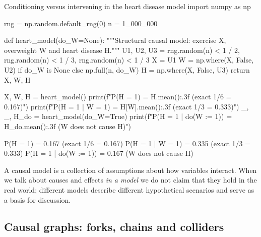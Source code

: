 \begin{pylisting}[label={lst:heart}]{Conditioning versus intervening in the heart disease model}
import numpy as np

rng = np.random.default_rng(0)
n = 1_000_000

def heart_model(do_W=None):
    """Structural causal model: exercise X, overweight W and heart disease H."""
    U1, U2, U3 = rng.random(n) < 1 / 2, rng.random(n) < 1 / 3, rng.random(n) < 1 / 3
    X = U1
    W = np.where(X, False, U2) if do_W is None else np.full(n, do_W)
    H = np.where(X, False, U3)
    return X, W, H

X, W, H = heart_model()
print(f"P(H = 1)              = {H.mean():.3f}   (exact 1/6 = 0.167)")
print(f"P(H = 1 | W = 1)      = {H[W].mean():.3f}   (exact 1/3 = 0.333)")
_, _, H_do = heart_model(do_W=True)
print(f"P(H = 1 | do(W := 1)) = {H_do.mean():.3f}   (W does not cause H)")
\end{pylisting}
\begin{pyoutput}
P(H = 1)              = 0.167   (exact 1/6 = 0.167)
P(H = 1 | W = 1)      = 0.335   (exact 1/3 = 0.333)
P(H = 1 | do(W := 1)) = 0.167   (W does not cause H)
\end{pyoutput}

A causal model is a collection of assumptions about how variables interact. When we talk about
causes and effects \emph{in a model} we do not claim that they hold in the real world; different
models describe different hypothetical scenarios and serve as a basis for discussion.

\subsection{Causal graphs: forks, chains and colliders}

